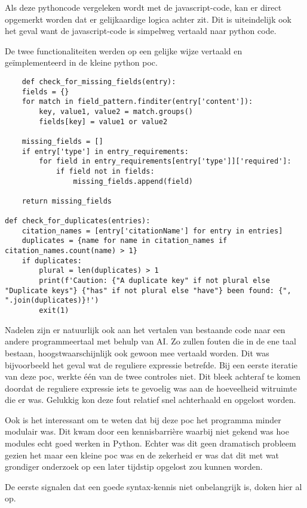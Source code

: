 Als deze pythoncode vergeleken wordt met de javascript-code, kan er direct opgemerkt worden dat er gelijkaardige logica achter zit. Dit is uiteindelijk ook het geval want de javascript-code is simpelweg vertaald naar python code.

De twee functionaliteiten werden op een gelijke wijze vertaald en geïmplementeerd in de kleine python poc.

\begin{verbatim}
    def check_for_missing_fields(entry):
    fields = {}
    for match in field_pattern.finditer(entry['content']):
        key, value1, value2 = match.groups()
        fields[key] = value1 or value2

    missing_fields = []
    if entry['type'] in entry_requirements:
        for field in entry_requirements[entry['type']]['required']:
            if field not in fields:
                missing_fields.append(field)

    return missing_fields

def check_for_duplicates(entries):
    citation_names = [entry['citationName'] for entry in entries]
    duplicates = {name for name in citation_names if citation_names.count(name) > 1}
    if duplicates:
        plural = len(duplicates) > 1
        print(f'Caution: {"A duplicate key" if not plural else "Duplicate keys"} {"has" if not plural else "have"} been found: {", ".join(duplicates)}!')
        exit(1)
\end{verbatim}

Nadelen zijn er natuurlijk ook aan het vertalen van bestaande code naar een andere programmeertaal met behulp van AI. Zo zullen fouten die in de ene taal bestaan, hoogstwaarschijnlijk ook gewoon mee vertaald worden. Dit was bijvoorbeeld het geval wat de reguliere expressie betrefde. Bij een eerste iteratie van deze poc, werkte één van de twee controles niet. Dit bleek achteraf te komen doordat de reguliere expressie iets te gevoelig was aan de hoeveelheid witruimte die er was. Gelukkig kon deze fout relatief snel achterhaald en opgelost worden.

Ook is het interessant om te weten dat bij deze poc het programma minder modulair was. Dit kwam door een kennisbarrière waarbij niet gekend was hoe modules echt goed werken in Python. Echter was dit geen dramatisch probleem gezien het maar een kleine poc was en de zekerheid er was dat dit met wat grondiger onderzoek op een later tijdstip opgelost zou kunnen worden.

De eerste signalen dat een goede syntax-kennis niet onbelangrijk is, doken hier al op.

